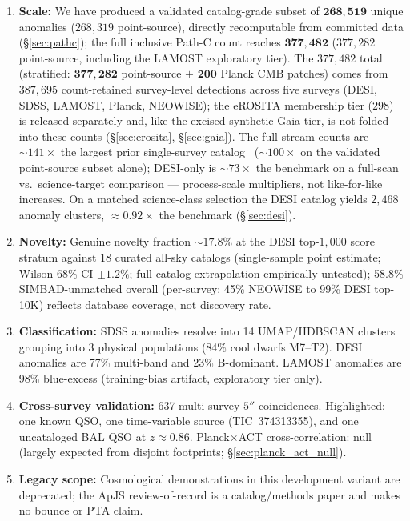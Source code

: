 \documentclass[aps,prd,twocolumn,superscriptaddress,showpacs,preprintnumbers,nofootinbib,longbibliography,floatfix]{revtex4-2}
\begin{document}
\begin{enumerate}[leftmargin=*]
\item \textbf{Scale:} We have produced a validated catalog-grade subset of $\mathbf{268{,}519}$ unique anomalies ($268{,}319$ point-source), directly recomputable from committed data (\S\ref{sec:pathc}); the full inclusive Path-C count reaches $\mathbf{377{,}482}$ ($377{,}282$ point-source, including the LAMOST exploratory tier). The $377{,}482$ total (stratified: $\mathbf{377{,}282}$ point-source $+$ $\mathbf{200}$ Planck CMB patches) comes from $387{,}695$ count-retained survey-level detections across five surveys (DESI, SDSS, LAMOST, Planck, NEOWISE); the eROSITA membership tier ($298$) is released separately and, like the excised synthetic Gaia tier, is not folded into these counts (\S\ref{sec:erosita}, \S\ref{sec:gaia}). The full-stream counts are $\sim\!141\times$ the largest prior single-survey catalog~\cite{Liang2023} ($\sim\!100\times$ on the validated point-source subset alone); DESI-only is $\sim\!73\times$ the benchmark on a full-scan vs.\ science-target comparison --- process-scale multipliers, not like-for-like increases. On a matched science-class selection the DESI catalog yields $2{,}468$ anomaly clusters, $\approx\!0.92\times$ the benchmark (\S\ref{sec:desi}).

\item \textbf{Novelty:} Genuine novelty fraction $\sim\!17.8\%$ at the DESI top-$1{,}000$ score stratum against 18 curated all-sky catalogs (single-sample point estimate; Wilson 68\% CI $\pm 1.2\%$; full-catalog extrapolation empirically untested); 58.8\% SIMBAD-unmatched overall (per-survey: 45\% NEOWISE to 99\% DESI top-10K) reflects database coverage, not discovery rate.

\item \textbf{Classification:} SDSS anomalies resolve into 14 UMAP/HDBSCAN clusters grouping into 3 physical populations (84\% cool dwarfs M7--T2). DESI anomalies are 77\% multi-band and 23\% B-dominant. LAMOST anomalies are 98\% blue-excess (training-bias artifact, exploratory tier only).

\item \textbf{Cross-survey validation:} 637 multi-survey $5''$ coincidences. Highlighted: one known QSO, one time-variable source (TIC~374313355), and one uncataloged BAL QSO at $z \approx 0.86$. Planck$\times$ACT cross-correlation: null (largely expected from disjoint footprints; \S\ref{sec:planck_act_null}).

\item \textbf{Legacy scope:} Cosmological demonstrations in this development variant are deprecated; the ApJS review-of-record is a catalog/methods paper and makes no bounce or PTA claim.


\end{enumerate}
\end{document}
